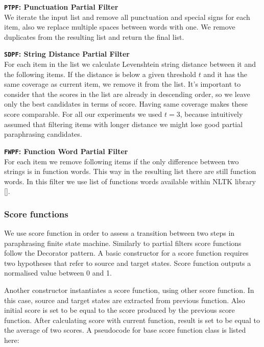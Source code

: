\begin{flushleft}

\textbf{\texttt{PTPF}: \textbf{Punctuation Partial Filter}} \\
We iterate the input list and remove all punctuation and special signs for each item, also we replace multiple spaces between words with one. We remove duplicates from the resulting list and return the final list.\\
\bigskip 
\bigskip 

\textbf{\texttt{SDPF}: \textbf{String Distance Partial Filter}} \\
For each item in the list we calculate Levenshtein string distance between it and the following items. If the distance is below a given threshold $t$ and it has the same coverage as current item, we remove it from the list. It's important to consider that the scores in the list are already in descending order, so we leave only the best candidates in terms of score. Having same coverage makes these score comparable. For all our experiments we used $t = 3$, because intuitively assumed that filtering items with longer distance we might lose good partial paraphrasing candidates. \\
\bigskip 

\textbf{\texttt{FWPF}: \textbf{Function Word Partial Filter}} \\
For each item we remove following items if the only difference between two strings is in function words. This way in the resulting list there are still function words. In this filter we use list of functions words available within NLTK library []. \\
\bigskip 

\end{flushleft} 

\subsubsection{Score functions}

We use score function in order to assess a transition between two steps in paraphrasing finite state machine. Similarly to partial filters score functions follow the Decorator pattern. A basic constructor for a score function requires two hypotheses that refer to source and target states. Score function outputs a normalised value between 0 and 1. 

Another constructor instantiates a score function, using other score function. In this case, source and target states are extracted from previous function. Also initial score is set to be equal to the score produced by the previous score function. After calculating score with current function, result is set to be equal to the average of two scores. A pseudocode for base score function class is listed here:

